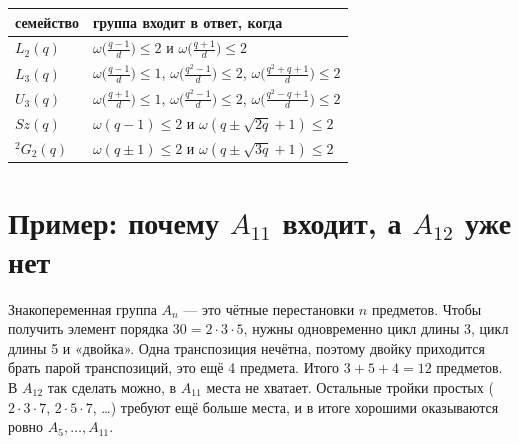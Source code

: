 \documentclass[11pt,a4paper]{article}
\begin{document}
\begin{center}\small
\begin{tabular}{@{}ll@{}}\toprule
семейство & группа входит в ответ, когда \\\midrule
$L_2(q)$ & $\omega\big(\tfrac{q-1}{d}\big)\le 2$ и $\omega\big(\tfrac{q+1}{d}\big)\le 2$ \\
$L_3(q)$ & $\omega\big(\tfrac{q-1}{d}\big)\le 1$, $\omega\big(\tfrac{q^2-1}{d}\big)\le 2$, $\omega\big(\tfrac{q^2+q+1}{d}\big)\le 2$ \\
$U_3(q)$ & $\omega\big(\tfrac{q+1}{d}\big)\le 1$, $\omega\big(\tfrac{q^2-1}{d}\big)\le 2$, $\omega\big(\tfrac{q^2-q+1}{d}\big)\le 2$ \\
$Sz(q)$ & $\omega(q-1)\le 2$ и $\omega(q\pm\sqrt{2q}+1)\le 2$ \\
${}^2G_2(q)$ & $\omega(q\pm1)\le 2$ и $\omega(q\pm\sqrt{3q}+1)\le 2$ \\\bottomrule
\end{tabular}
\end{center}

\section{Пример: почему $A_{11}$ входит, а $A_{12}$ уже нет}

Знакопеременная группа $A_n$ — это чётные перестановки $n$ предметов. Чтобы получить элемент порядка $30 = 2\cdot3\cdot5$, нужны одновременно цикл длины 3, цикл длины 5 и «двойка». Одна транспозиция нечётна, поэтому двойку приходится брать парой транспозиций, это ещё 4 предмета. Итого $3+5+4 = 12$ предметов. В $A_{12}$ так сделать можно, в $A_{11}$ места не хватает. Остальные тройки простых ($2\cdot3\cdot7$, $2\cdot5\cdot7$, \dots) требуют ещё больше места, и в итоге хорошими оказываются ровно $A_5,\dots,A_{11}$.

\begin{center}
\end{center}
\end{document}
